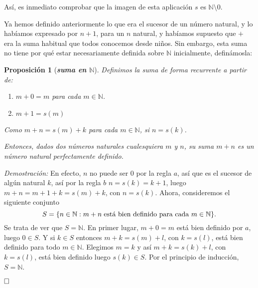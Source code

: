 \documentclass[12pt]{article}
\newtheorem{proposition}[theorem]{Proposición}
\begin{document}
Así, es inmediato comprobar que la imagen de esta aplicación $s$ es $\mathbb{N}\setminus 0$. 

Ya hemos definido anteriormente lo que era el sucesor de un número natural, y lo habíamos expresado por $n+1$, para un $n$ natural, y habíamos supuesto que $+$ era la suma habitual que todos conocemos desde niños. Sin embargo, esta suma no tiene por qué estar necesariamente definida sobre $\mathbb{N}$ inicialmente, definámosla:

\begin{proposition}[\textbf{\textit{suma en $\mathbb{N}$}}]Definimos la suma de forma recurrente a partir de: 
\renewcommand{\theenumi}{\alph{enumi}} 
\begin{enumerate}
\item $m+0 = m$ para cada $m \in \mathbb{N}$.
\item $m+1 = s(m)$
\end{enumerate}

Como $m+n = s(m) + k$ para cada $m \in \mathbb{N}$, si $n=s(k)$.

Entonces, dados dos números naturales cualesquiera $m$ y $n$, su suma $m+n$ es un número natural perfectamente definido.
\end{proposition}
\emph{Demostración: }En efecto, $n$ no puede ser $0$ por la regla $a$, así que es el sucesor de algún natural $k$, así por la regla $b$ $n = s(k) = k+1$, luego $m+n = m+1 + k = s(m) + k$, con $n = s(k)$. Ahora, consideremos el siguiente conjunto
$$S = \lbrace n \in \mathbb{N}: m+n \hspace{0.1cm} \text{está bien definido para cada $m \in \mathbb{N}$}\rbrace.$$
Se trata de ver que $S = \mathbb{N}$. En primer lugar, $m+0 = m$ está bien definido por $a$, luego $0 \in S$. Y si $k \in S$ entonces $m+k=s(m)+l$, con $k=s(l)$, está bien definido para todo $m \in \mathbb{N}$. Elegimos $m=k$ y así $m+k = s(k)+l$, con $k=s(l)$, está bien definido luego $s(k) \in S$. Por el principio de inducción, $S = \mathbb{N}$.

$\hfill \square$
\end{document}
